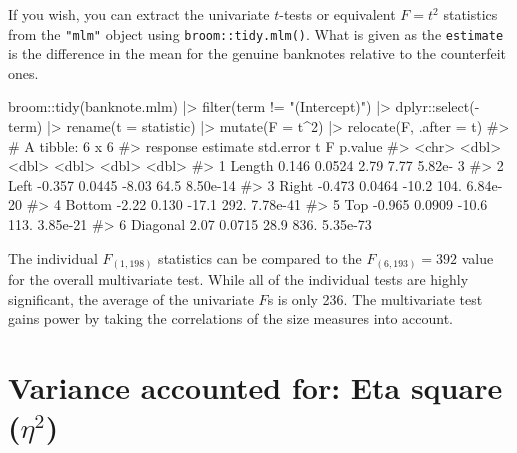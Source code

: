 \documentclass[
  letterpaper,
  10pt,
  krantz2]{krantz}
\makeatletter
\newenvironment{Shaded}{\begin{snugshade}}{\end{snugshade}}
\newcommand{\AttributeTok}[1]{\textcolor[rgb]{0.40,0.45,0.13}{#1}}
\newcommand{\CommentTok}[1]{\textcolor[rgb]{0.37,0.37,0.37}{#1}}
\newcommand{\DecValTok}[1]{\textcolor[rgb]{0.68,0.00,0.00}{#1}}
\newcommand{\FunctionTok}[1]{\textcolor[rgb]{0.28,0.35,0.67}{#1}}
\newcommand{\NormalTok}[1]{\textcolor[rgb]{0.00,0.23,0.31}{#1}}
\newcommand{\SpecialCharTok}[1]{\textcolor[rgb]{0.37,0.37,0.37}{#1}}
\newcommand{\StringTok}[1]{\textcolor[rgb]{0.13,0.47,0.30}{#1}}
\newenvironment{kframe}{%
  \medskip{}
  \setlength{\fboxsep}{.8em}
  \def\at@end@of@kframe{}%
  \ifinner\ifhmode%
  \def\at@end@of@kframe{\end{minipage}}%
  \begin{minipage}{\columnwidth}%
  \fi\fi%
  \def\FrameCommand##1{\hskip\@totalleftmargin \hskip-\fboxsep
  \colorbox{shadecolor}{##1}\hskip-\fboxsep
      \hskip-\linewidth \hskip-\@totalleftmargin \hskip\columnwidth}%
  \MakeFramed {\advance\hsize-\width
    \@totalleftmargin\z@ \linewidth\hsize
    \@setminipage}}%
{\par\unskip\endMakeFramed%
  \at@end@of@kframe}
\renewenvironment{Shaded}{\begin{kframe}}{\end{kframe}}
\makeatother
\begin{document}
If you wish, you can extract the univariate \(t\)-tests or equivalent
\(F = t^2\) statistics from the \texttt{"mlm"} object using
\texttt{broom::tidy.mlm()}. What is given as the \texttt{estimate} is
the difference in the mean for the genuine banknotes relative to the
counterfeit ones.

\begin{Shaded}
\begin{Highlighting}[]
\NormalTok{broom}\SpecialCharTok{::}\FunctionTok{tidy}\NormalTok{(banknote.mlm) }\SpecialCharTok{|\textgreater{}} 
  \FunctionTok{filter}\NormalTok{(term }\SpecialCharTok{!=} \StringTok{"(Intercept)"}\NormalTok{) }\SpecialCharTok{|\textgreater{}}
\NormalTok{  dplyr}\SpecialCharTok{::}\FunctionTok{select}\NormalTok{(}\SpecialCharTok{{-}}\NormalTok{term) }\SpecialCharTok{|\textgreater{}}
  \FunctionTok{rename}\NormalTok{(}\AttributeTok{t =}\NormalTok{ statistic) }\SpecialCharTok{|\textgreater{}}
  \FunctionTok{mutate}\NormalTok{(}\AttributeTok{F =}\NormalTok{ t}\SpecialCharTok{\^{}}\DecValTok{2}\NormalTok{) }\SpecialCharTok{|\textgreater{}}
  \FunctionTok{relocate}\NormalTok{(F, }\AttributeTok{.after =}\NormalTok{ t)}
\CommentTok{\#\textgreater{} \# A tibble: 6 x 6}
\CommentTok{\#\textgreater{}   response estimate std.error      t      F  p.value}
\CommentTok{\#\textgreater{}   \textless{}chr\textgreater{}       \textless{}dbl\textgreater{}     \textless{}dbl\textgreater{}  \textless{}dbl\textgreater{}  \textless{}dbl\textgreater{}    \textless{}dbl\textgreater{}}
\CommentTok{\#\textgreater{} 1 Length      0.146    0.0524   2.79   7.77 5.82e{-} 3}
\CommentTok{\#\textgreater{} 2 Left       {-}0.357    0.0445  {-}8.03  64.5  8.50e{-}14}
\CommentTok{\#\textgreater{} 3 Right      {-}0.473    0.0464 {-}10.2  104.   6.84e{-}20}
\CommentTok{\#\textgreater{} 4 Bottom     {-}2.22     0.130  {-}17.1  292.   7.78e{-}41}
\CommentTok{\#\textgreater{} 5 Top        {-}0.965    0.0909 {-}10.6  113.   3.85e{-}21}
\CommentTok{\#\textgreater{} 6 Diagonal    2.07     0.0715  28.9  836.   5.35e{-}73}
\end{Highlighting}
\end{Shaded}

The individual \(F_{(1, 198)}\) statistics can be compared to the
\(F_{(6, 193)} = 392\) value for the overall multivariate test. While
all of the individual tests are highly significant, the average of the
univariate \(F\)s is only 236. The multivariate test gains power by
taking the correlations of the size measures into account.

\hypertarget{variance-accounted-for-eta-square-eta2}{%
\section{\texorpdfstring{Variance accounted for: Eta square
(\(\eta^2\))}{Variance accounted for: Eta square (\textbackslash eta\^{}2)}}\label{variance-accounted-for-eta-square-eta2}}
\end{document}
